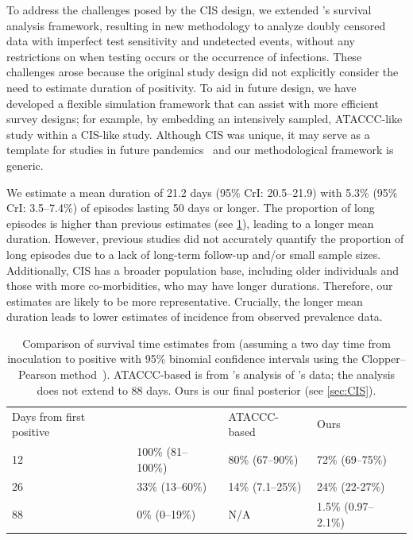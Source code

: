 \documentclass[referee,useAMS,usenatbib]{biom}
\begin{document}
To address the challenges posed by the CIS design, we extended \citet{heiseyModelling}'s survival analysis framework, resulting in new methodology to analyze doubly censored data with imperfect test sensitivity and undetected events, without any restrictions on when testing occurs or the occurrence of infections.
These challenges arose because the original study design did not explicitly consider the need to estimate duration of positivity.
To aid in future design, we have developed a flexible simulation framework that can assist with  more efficient survey designs; for example, by embedding an intensively sampled, ATACCC-like study within a CIS-like study.
Although CIS was unique, it may serve as a template for studies in future pandemics~\citep{hallettModule} and our methodological framework is generic.

We estimate a mean duration of 21.2 days (95\% CrI: 20.5--21.9) with 5.3\% (95\% CrI: 3.5--7.4\%) of episodes lasting 50 days or longer.
The proportion of long episodes is higher than previous estimates (see \cref{tab:compare-survival}), leading to a longer mean duration.
However, previous studies did not accurately quantify the proportion of long episodes due to a lack of long-term follow-up and/or small sample sizes.
Additionally, CIS has a broader population base, including older individuals and those with more co-morbidities, who may have longer durations.
Therefore, our estimates are likely to be more representative.
Crucially, the longer mean duration leads to lower estimates of incidence from observed prevalence data.

\begin{table}[]
\caption{
    Comparison of survival time estimates from
    \citet{killingleySafety} (assuming a two day time from inoculation to positive with 95\% binomial confidence intervals using the Clopper--Pearson method~\citep{clopperUse}).
    ATACCC-based is from \citet{blakeThesis}'s analysis of \citet{hakkiOnset}'s data; the analysis does not extend to 88 days.
    Ours is our final posterior (see \cref{sec:CIS}).
}
\centering
\begin{tabular}{llll}
Days from first positive & \citet{killingleySafety}  & ATACCC-based     & Ours                \\
12                       & 100\% (81--100\%) & 80\% (67--90\%)  & 72\% (69--75\%)     \\
26                       & 33\% (13--60\%)   & 14\% (7.1--25\%) & 24\% (22-27\%)      \\
88                       & 0\% (0--19\%)     & N/A              & 1.5\% (0.97--2.1\%)
\end{tabular}
\label{tab:compare-survival}
\end{table}
\end{document}
